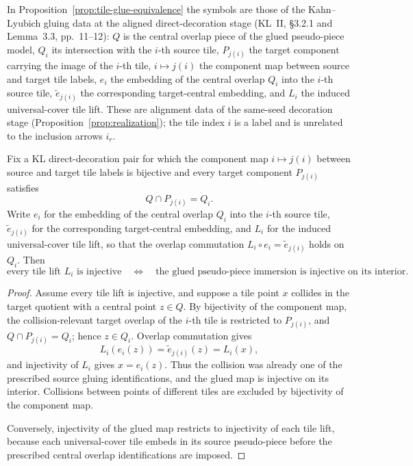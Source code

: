 \begin{remark}\label{rem:tile-glue-notation}
In Proposition~\ref{prop:tile-glue-equivalence} the symbols are those
of the Kahn--Lyubich gluing data at the aligned direct-decoration
stage (KL~II, \S3.2.1 and Lemma~3.3, pp.~11--12): \(Q\) is the central
overlap piece of the glued pseudo-piece model, \(Q_i\) its
intersection with the \(i\)-th source tile, \(P_{j(i)}\) the target
component carrying the image of the \(i\)-th tile, \(i\mapsto j(i)\)
the component map between source and target tile labels, \(e_i\) the
embedding of the central overlap \(Q_i\) into the \(i\)-th source
tile, \(\widetilde e_{j(i)}\) the corresponding target-central
embedding, and \(L_i\) the induced universal-cover tile lift.  These
are alignment data of the same-seed decoration stage
(Proposition~\ref{prop:realization}); the tile index \(i\) is a label
and is unrelated to the inclusion arrows \(i_r\).
\end{remark}

\begin{proposition}
\label{prop:tile-glue-equivalence}
Fix a KL direct-decoration pair for which the component map
\(i\mapsto j(i)\) between source and target tile labels is bijective
and every target component \(P_{j(i)}\) satisfies
\[
 Q\cap P_{j(i)}=Q_i .
\]
Write \(e_i\) for the embedding of the central overlap \(Q_i\) into
the \(i\)-th source tile, \(\widetilde e_{j(i)}\) for the
corresponding target-central embedding, and \(L_i\) for the induced
universal-cover tile lift, so that the overlap commutation
\(L_i\circ e_i=\widetilde e_{j(i)}\) holds on \(Q_i\).  Then
\[
 \text{every tile lift }L_i\text{ is injective}
 \quad\Longleftrightarrow\quad
 \text{the glued pseudo-piece immersion is injective on its interior}.
\]
\end{proposition}

\begin{proof}
Assume every tile lift is injective, and suppose a tile point \(x\)
collides in the target quotient with a central point \(z\in Q\).  By
bijectivity of the component map, the collision-relevant target
overlap of the \(i\)-th tile is restricted to \(P_{j(i)}\), and
\(Q\cap P_{j(i)}=Q_i\); hence \(z\in Q_i\).  Overlap commutation gives
\[
 L_i(e_i(z))=\widetilde e_{j(i)}(z)=L_i(x),
\]
and injectivity of \(L_i\) gives \(x=e_i(z)\).  Thus the collision was
already one of the prescribed source gluing identifications, and the
glued map is injective on its interior.  Collisions between points of
different tiles are excluded by bijectivity of the component map.

Conversely, injectivity of the glued map restricts to injectivity of
each tile lift, because each universal-cover tile embeds in its source
pseudo-piece before the prescribed central overlap identifications are
imposed.
\end{proof}